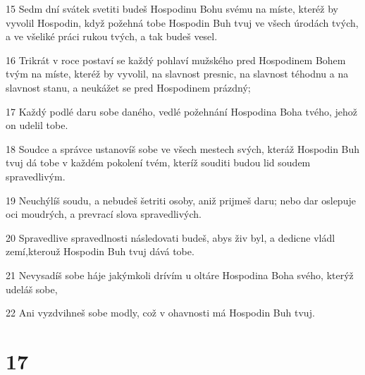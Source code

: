 \par 15 Sedm dní svátek svetiti budeš Hospodinu Bohu svému na míste, kteréž by vyvolil Hospodin, když požehná tobe Hospodin Buh tvuj ve všech úrodách tvých, a ve všeliké práci rukou tvých, a tak budeš vesel.
\par 16 Trikrát v roce postaví se každý pohlaví mužského pred Hospodinem Bohem tvým na míste, kteréž by vyvolil, na slavnost presnic, na slavnost téhodnu a na slavnost stanu, a neukážet se pred Hospodinem prázdný;
\par 17 Každý podlé daru sobe daného, vedlé požehnání Hospodina Boha tvého, jehož on udelil tobe.
\par 18 Soudce a správce ustanovíš sobe ve všech mestech svých, kteráž Hospodin Buh tvuj dá tobe v každém pokolení tvém, kteríž souditi budou lid soudem spravedlivým.
\par 19 Neuchýlíš soudu, a nebudeš šetriti osoby, aniž prijmeš daru; nebo dar oslepuje oci moudrých, a prevrací slova spravedlivých.
\par 20 Spravedlive spravedlnosti následovati budeš, abys živ byl, a dedicne vládl zemí,kterouž Hospodin Buh tvuj dává tobe.
\par 21 Nevysadíš sobe háje jakýmkoli drívím u oltáre Hospodina Boha svého, kterýž udeláš sobe,
\par 22 Ani vyzdvihneš sobe modly, což v ohavnosti má Hospodin Buh tvuj.

\chapter{17}

